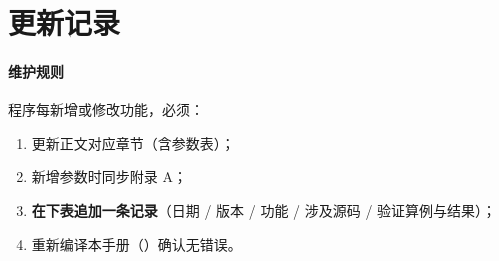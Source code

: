 \section{更新记录}
\label{app:changelog}

\paragraph{维护规则}程序每新增或修改功能，必须：
\begin{enumerate}
  \item 更新正文对应章节（含参数表）；
  \item 新增参数时同步附录 A；
  \item \textbf{在下表追加一条记录}（日期 / 版本 / 功能 / 涉及源码 / 验证算例与结果）；
  \item 重新编译本手册（）确认无错误。
\end{enumerate}

